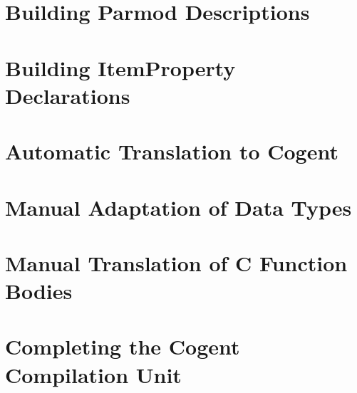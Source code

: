 \documentclass[a4paper]{report}
\begin{document}
\section{Building Parmod Descriptions}
\label{app-parmod}


\section{Building ItemProperty Declarations}
\label{app-itemprops}


\section{Automatic Translation to Cogent}
\label{app-transauto}


\section{Manual Adaptation of Data Types}
\label{app-transtype}


\section{Manual Translation of C Function Bodies}
\label{app-transfunction}


\section{Completing the Cogent Compilation Unit}
\label{app-unit}
%
\end{document}
